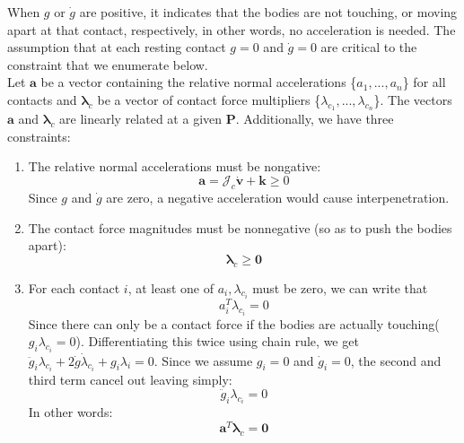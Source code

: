         When $g$ or $\dot{g}$ are positive, it indicates that the bodies are not touching, or moving apart at that contact, respectively, in other words, no acceleration is needed. The assumption that at each resting contact $g = 0$ and $\dot{g} = 0 $ are critical to the constraint that we enumerate below.\\

        Let $\pmb{a}$ be a vector containing the relative normal accelerations \{$a_1,...,a_n$\} for all contacts and $\pmb{\lambda}_c$ be a vector of contact force multipliers \{$\lambda_{c_1},..., \lambda_{c_n}$\}. The vectors $\pmb{a}$ and $\pmb{\lambda}_c$ are linearly related at a given $\mathbf{P}$. Additionally, we have three constraints:
        \begin{enumerate}
            \item The relative normal accelerations must be nongative:
            \begin{equation}
                \pmb{a} = \mathcal{J}_c\dot{\mathbf{v}}+\pmb{k} \ge 0
            \end{equation}
            Since $g$ and $\dot{g}$ are zero, a negative acceleration would cause interpenetration.
            \item The contact force magnitudes must be nonnegative (so as to push the bodies apart): 
            \begin{equation}
                \pmb{\lambda}_c \ge \pmb{0}
            \end{equation}
            \item For each contact $i$, at least one of $a_i, \lambda_{c_i}$ must be zero, we can write that
            \begin{equation}
                a_{i}^{T}\lambda_{c_{i}} = 0
            \end{equation}
            Since there can only be a contact force if the bodies are actually touching($g_i\lambda_{c_i} = 0$). Differentiating this twice using chain rule, we get $\ddot{g}_i\lambda_{c_i} + 2\dot{g}\dot{\lambda}_{c_i} + g_i\lambda_{i} = 0$. Since we assume $g_i = 0$ and $\dot{g}_i = 0$, the second and third term cancel out leaving simply:
            \begin{equation}
                \ddot{g}_i \lambda_{c_i}=0
            \end{equation}
            In other words:
            \begin{equation}
                \pmb{a}^{T}\pmb{\lambda}_{c} = \pmb{0}
            \end{equation}
        \end{enumerate}

